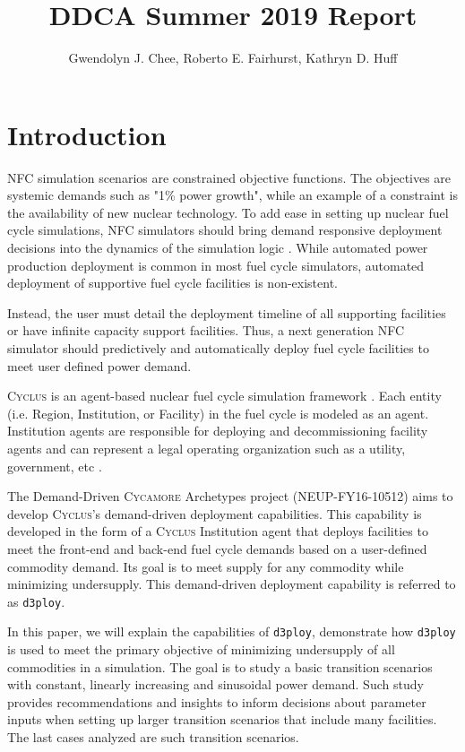 \documentclass[11pt,letterpaper]{article}
\title{DDCA Summer 2019 Report}
\author{Gwendolyn J. Chee, Roberto E. Fairhurst, Kathryn D. Huff}
\newcommand{\Cyclus}{\textsc{Cyclus}\xspace}%
\newcommand{\Cycamore}{\textsc{Cycamore}\xspace}%
\newcommand{\deploy}{\texttt{d3ploy}\xspace}%
\begin{document}
	\begin{titlepage}
	\maketitle
	\thispagestyle{empty}
	\end{titlepage}

\section{Introduction}
\gls{NFC} simulation scenarios are constrained objective functions. 
The objectives are systemic demands such as "1\% power growth", 
while an example of a constraint is the availability of new nuclear 
technology. 
To add ease in setting up nuclear fuel cycle simulations, \gls{NFC}
simulators should bring demand responsive deployment decisions into 
the dynamics of the simulation logic \cite{huff_current_2017}. 
While automated power production deployment is common in most fuel 
cycle simulators, automated deployment of supportive fuel cycle 
facilities is non-existent. 

Instead, the user must detail the deployment timeline of all 
supporting facilities or have infinite capacity support facilities. 
Thus, a next generation \gls{NFC} simulator should predictively and 
automatically deploy fuel cycle facilities to meet user defined 
power demand. 

\Cyclus is an agent-based nuclear fuel cycle simulation framework 
\cite{huff_fundamental_2016}. 
Each entity (i.e. Region, Institution, or Facility) in the fuel 
cycle is modeled as an agent. 
Institution agents
are responsible for deploying and decommissioning facility agents 
and can represent a legal operating organization such as a 
utility, government, etc \cite{huff_fundamental_2016}. 

The Demand-Driven \Cycamore Archetypes project (NEUP-FY16-10512)
aims to develop \Cyclus's demand-driven deployment capabilities. 
This capability is developed in the form of a \Cyclus Institution
agent that deploys facilities to meet the front-end and back-end 
fuel cycle demands based on a user-defined commodity demand. 
Its goal is to meet supply for any commodity while minimizing 
undersupply.
This demand-driven deployment capability is referred to as 
\deploy. 

In this paper, we will explain the capabilities of \deploy, 
demonstrate how \deploy is used to meet the primary objective
of minimizing undersupply of all commodities in a simulation.
The goal is to study a basic transition scenarios with constant,
linearly increasing and sinusoidal power demand. Such study
provides recommendations and insights to inform 
decisions about parameter inputs when setting up 
larger transition scenarios that include many facilities.
The last cases analyzed are such transition scenarios.
\end{document}
